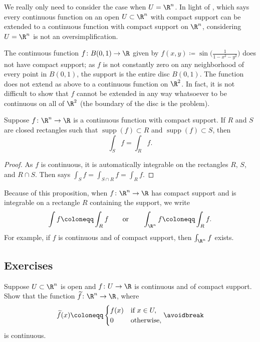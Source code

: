 We really only need to consider the case when $U=\R^n$.  In light of
, which says every continuous
function on an open $U \subset \R^n$ with compact support can be extended to a
continuous function with compact support on $\R^n$,
considering $U=\R^n$ is not an oversimplification.

\begin{example}
The continuous function $f \colon B(0,1) \to \R$ given by
$f(x,y) \coloneqq \sin\bigl(\frac{1}{1-x^2-y^2}\bigr)$
does not have compact support;
as $f$ is not constantly zero on any neighborhood of every point in $B(0,1)$,
the support is the entire disc $B(0,1)$.  The function 
does not extend as above to a continuous function on $\R^2$.  In fact, it is not
difficult to show that $f$ cannot be extended in any way whatsoever to be
continuous on all of $\R^2$ (the boundary of the disc is the problem).
\end{example}

\begin{prop} \label{mv:prop:rectanglessupp}
Suppose $f \colon \R^n \to \R$ is a continuous function with compact support.
If $R$ and $S$ are closed rectangles such that
$\operatorname{supp}(f) \subset R$
and
$\operatorname{supp}(f) \subset S$, then
\begin{equation*}
\int_S f = \int_R f .
\end{equation*}
\end{prop}

\begin{proof}
As $f$ is continuous, it is automatically integrable on the rectangles $R$, $S$, and $R
\cap S$.
Then  says
$\int_S f = \int_{S \cap R} f = \int_R f$.
\end{proof}

Because of this proposition, when $f \colon \R^n \to \R$ has compact support
and is integrable on a rectangle $R$ containing the support, we write
\begin{equation*}
\int f \coloneqq \int_R f \qquad \text{or} \qquad 
\int_{\R^n} f \coloneqq \int_R f .
\end{equation*}
For example, if $f$ is continuous and of compact support, then
$\int_{\R^n} f$ exists.

\subsection{Exercises}

\begin{exercise} \label{exercise:contcompactsupportRn}
Suppose $U \subset \R^n$ is open and $f \colon U \to \R$ is continuous and
of compact support.  Show that the function $\widetilde{f} \colon \R^n \to
\R$, where
\begin{equation*}
\widetilde{f}(x) \coloneqq
\begin{cases}
f(x) & \text{if } x \in U, \\
0 & \text{otherwise,}
\end{cases}
\avoidbreak
\end{equation*}
is continuous.
\end{exercise}


